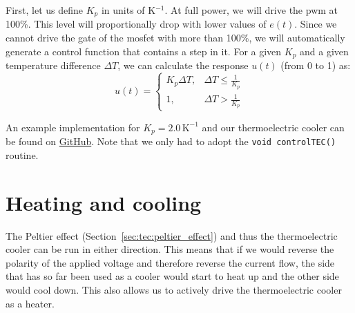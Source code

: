 First, let us define $K_p$ in units of K$^{-1}$. At full power, we will drive the \ac{pwm} at 100\%. This level will proportionally drop with lower values of $e(t)$. Since we cannot drive the gate of the \ac{mosfet} with more than 100\%, we will automatically generate a control function that contains a step in it. For a given $K_p$ and a given temperature difference $\Delta T$, we can calculate the response $u(t)$ (from 0 to 1) as:
\begin{equation}
  u(t) = \left\{ 
    \begin{array}{ll}
      K_p \Delta T,   & \Delta T \leq \frac{1}{K_p} \\
      1,              & \Delta T > \frac{1}{K_p}
    \end{array}
  \right.
\end{equation}

An example implementation for $K_p = 2.0\,\mathrm{K}^{-1}$ and our thermoelectric cooler can be found on \href{https://github.com/galactic-forensics/workshop_arduino_electronics/tree/main/further_examples/p_control}{GitHub}. Note that we only had to adopt the \lstinline{void controlTEC()} routine.




\section{Heating and cooling}

The Peltier effect (Section~\ref{sec:tec:peltier_effect}) and thus the thermoelectric cooler can be run in either direction. This means that if we would reverse the polarity of the applied voltage and therefore reverse the current flow, the side that has so far been used as a cooler would start to heat up and the other side would cool down. This also allows us to actively drive the thermoelectric cooler as a heater.


